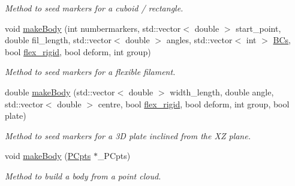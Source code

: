 \begin{DoxyCompactItemize}
\begin{DoxyCompactList}\small\item\em Method to seed markers for a cuboid / rectangle. \end{DoxyCompactList}\item 
void \hyperlink{class_i_b_body_ab83346d555202a5cf669c7e309dc856a}{make\+Body} (int numbermarkers, std\+::vector$<$ double $>$ start\+\_\+point, double fil\+\_\+length, std\+::vector$<$ double $>$ angles, std\+::vector$<$ int $>$ \hyperlink{class_i_b_body_ad9fa313d9cb2c2c463740eed5a1faf16}{B\+Cs}, bool \hyperlink{class_i_b_body_a526f3e83b45b991a79941ee745698ea5}{flex\+\_\+rigid}, bool deform, int group)
\begin{DoxyCompactList}\small\item\em Method to seed markers for a flexible filament. \end{DoxyCompactList}\item 
double \hyperlink{class_i_b_body_a34380e523aef0978495d52bc91f3d74b}{make\+Body} (std\+::vector$<$ double $>$ width\+\_\+length, double angle, std\+::vector$<$ double $>$ centre, bool \hyperlink{class_i_b_body_a526f3e83b45b991a79941ee745698ea5}{flex\+\_\+rigid}, bool deform, int group, bool plate)
\begin{DoxyCompactList}\small\item\em Method to seed markers for a 3D plate inclined from the XZ plane. \end{DoxyCompactList}\item 
void \hyperlink{class_i_b_body_aad21167e57221cb4faf5a15ffebc438d}{make\+Body} (\hyperlink{class_p_cpts}{P\+Cpts} $\ast$\+\_\+\+P\+Cpts)
\begin{DoxyCompactList}\small\item\em Method to build a body from a point cloud. \end{DoxyCompactList}\end{DoxyCompactItemize}
